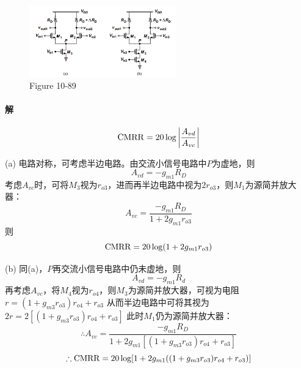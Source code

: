 \documentclass[hyperref, UTF8]{ctexart}
\newcommand{\CMRR}{{\rm CMRR}}
\begin{document}
    \begin{figure}[!htb]
        \centering
        \includegraphics[width=0.569\textwidth]{p10-89.png}
        \caption*{Figure 10-89}
    \end{figure}

\paragraph{解}
    $$\CMRR = 20\log\left|\frac{A_{vd}}{A_{vc}}\right|$$

    (a) 电路对称，可考虑半边电路。由交流小信号电路中$P$为虚地，则
    $$A_{vd}=-g_{m1}R_D$$
    考虑$A_{vc}$时，可将$M_3$视为$r_{o3}$，进而再半边电路中视为$2r_{o3}$，则$M_1$为源简并放大器：
    $$A_{vc}=\frac{-g_{m1}R_D}{1+2g_{m1}r_{o3}}$$
    则
    $$\CMRR = 20\log(1+2g_{m1}r_{o3})$$

    (b) 同(a)，$P$再交流小信号电路中仍未虚地，则
    $$A_{vd}=-g_{m1}R_d$$
    再考虑$A_{vc}$，将$M_4$视为$r_{o4}$，则$M_3$为源简并放大器，可视为电阻$r=(1+g_{m3}r_{o3})r_{o4}+r_{o3}$
    从而半边电路中可将其视为$2r=2[(1+g_{m3}r_{o3})r_{o4}+r_{o3}]$
    此时$M_1$仍为源简并放大器：
    $$\therefore A_{vc}=\frac{-g_{m1}R_D}{1+2g_{m1}[(1+g_{m3}r_{o3})r_{o4}+r_{o3}]}$$
    $$\therefore \CMRR = 20 \log [1+2g_{m1}((1+g_{m3}r_{o3})r_{o4}+r_{o3})]$$
\end{document}
